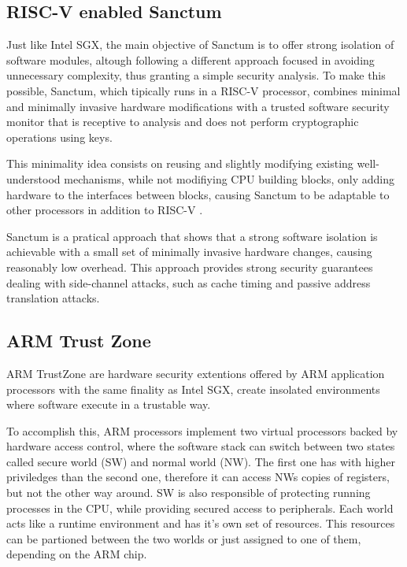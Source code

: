 \subsection{RISC-V enabled Sanctum}
\label{ssec:sanctum}

Just like Intel SGX, the main objective of Sanctum is to offer strong isolation of software modules, altough following a different approach focused in avoiding unnecessary complexity, thus granting a simple security analysis.
To make this possible, Sanctum, which tipically runs in a RISC-V processor, combines minimal and minimally invasive hardware modifications with a trusted software security monitor that is receptive to analysis and does not perform cryptographic operations using keys. 

This minimality idea consists on reusing and slightly modifying existing well-understood mechanisms, while not modifiying CPU building blocks, only adding hardware to the interfaces between blocks, causing Sanctum to be adaptable to other processors in addition to RISC-V \cite{sanctumPaper}. 

Sanctum is a pratical approach that shows that a strong software isolation is achievable with a small set of minimally invasive hardware changes, causing reasonably low overhead. 
This approach provides strong security guarantees dealing with side-channel attacks, such as cache timing and passive address translation attacks.

\subsection{ARM Trust Zone}
\label{ssec:armtz}

ARM TrustZone are hardware security extentions offered by ARM application processors with the same finality as Intel SGX, create insolated environments where software execute in a trustable way. 

To accomplish this, ARM processors implement two virtual processors backed by hardware access control, where the software stack can switch between two states called secure world (SW) and normal world (NW). 
The first one has with higher priviledges than the second one, therefore it can access NWs copies of registers, but not the other way around. SW is also responsible of protecting running processes in the CPU, while providing secured access to peripherals. 
Each world acts like a runtime environment and has it's own set of resources. This resources can be partioned between the two worlds or just assigned to one of them, depending on the ARM chip.

